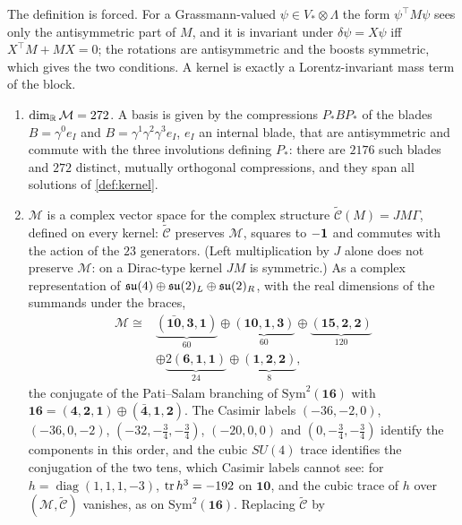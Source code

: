 The definition is forced. For a Grassmann-valued $\psi\in V_*\otimes\Lambda$ the form $\psi^{\!\top}M\psi$ sees only the antisymmetric part of
$M$, and it is invariant under $\delta\psi=X\psi$ iff $X^{\!\top}M+MX=0$; the rotations are antisymmetric and the boosts symmetric, which gives the
two conditions. A kernel is exactly a Lorentz-invariant mass term of the block.

\begin{theorem}
\label{thm:kernelspace}
\begin{enumerate}[label=(\roman*),leftmargin=2.2em]
\item $\dim_{\mathbb{R}}\mathcal M=272$. A basis is given by the compressions $P_*BP_*$ of the blades $B=\gamma^0e_I$ and $B=\gamma^1\gamma^2\gamma^3e_I$, $e_I$ an
internal blade, that are antisymmetric and commute with the three involutions defining $P_*$: there are $2176$ such blades and $272$ distinct,
mutually orthogonal compressions, and they span all solutions of \cref{def:kernel}.
\item $\mathcal M$ is a complex vector space for the complex structure $\widetilde{\mathcal C}(M)=JM\Gamma$, defined on every kernel: $\widetilde{\mathcal C}$
preserves $\mathcal M$, squares to $-\mathbf 1$ and commutes with the action of the $23$ generators. (Left multiplication by $J$ alone does not preserve $\mathcal M$:
on a Dirac-type kernel $JM$ is symmetric.) As a complex representation of $\mathfrak{su}(4)\oplus\mathfrak{su}(2)_L\oplus\mathfrak{su}(2)_R$, with the real dimensions of the summands under
the braces,
\[
\begin{aligned}
\mathcal M\cong{}&\underbrace{(\bar{\mathbf{10}},\mathbf3,\mathbf1)}_{60}\oplus\underbrace{(\mathbf{10},\mathbf1,\mathbf3)}_{60}\oplus\underbrace{(\mathbf{15},\mathbf2,\mathbf2)}_{120}\\
&\oplus\underbrace{2(\mathbf6,\mathbf1,\mathbf1)}_{24}\oplus\underbrace{(\mathbf1,\mathbf2,\mathbf2)}_{8},
\end{aligned}
\]
the conjugate of the Pati--Salam branching of $\mathrm{Sym}^2(\mathbf{16})$ with $\mathbf{16}=(\mathbf4,\mathbf2,\mathbf1)\oplus(\bar{\mathbf4},\mathbf1,\mathbf2)$. The Casimir labels
$(-36,-2,0)$, $(-36,0,-2)$, $(-32,-\tfrac34,-\tfrac34)$, $(-20,0,0)$ and $(0,-\tfrac34,-\tfrac34)$ identify the components in this order, and the cubic $SU(4)$
trace identifies the conjugation of the two tens, which Casimir labels cannot see: for $h=\operatorname{diag}(1,1,1,-3)$, $\operatorname{tr} h^3=-192$ on
$\mathbf{10}$, and the cubic trace of $h$ over $(\mathcal M,\widetilde{\mathcal C})$ vanishes, as on $\mathrm{Sym}^2(\mathbf{16})$. Replacing $\widetilde{\mathcal C}$ by

\end{enumerate}
\end{theorem}
